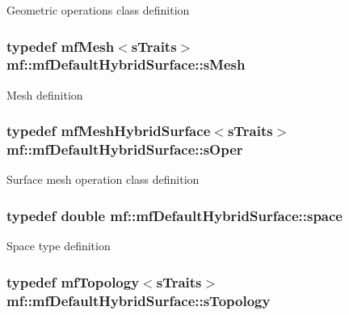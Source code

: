 \label{structmf_1_1mfDefaultHybridSurface_ae5b965dae8d0d44fffca8f6c2819487c}
Geometric operations class definition \hypertarget{structmf_1_1mfDefaultHybridSurface_a3ef0c32e3cccb46dbc126f3d40ade56c}{
\subsubsection[{sMesh}]{\setlength{\rightskip}{0pt plus 5cm}typedef {\bf mfMesh}$<${\bf sTraits}$>$ {\bf mf::mfDefaultHybridSurface::sMesh}}}
\label{structmf_1_1mfDefaultHybridSurface_a3ef0c32e3cccb46dbc126f3d40ade56c}
Mesh definition \hypertarget{structmf_1_1mfDefaultHybridSurface_a048af8fc38cf0f61cb53c72431bdf589}{
\subsubsection[{sOper}]{\setlength{\rightskip}{0pt plus 5cm}typedef {\bf mfMeshHybridSurface}$<${\bf sTraits}$>$ {\bf mf::mfDefaultHybridSurface::sOper}}}
\label{structmf_1_1mfDefaultHybridSurface_a048af8fc38cf0f61cb53c72431bdf589}
Surface mesh operation class definition \hypertarget{structmf_1_1mfDefaultHybridSurface_aa60f8021d9313ec87752ef7c4909d2fa}{
\subsubsection[{space}]{\setlength{\rightskip}{0pt plus 5cm}typedef double {\bf mf::mfDefaultHybridSurface::space}}}
\label{structmf_1_1mfDefaultHybridSurface_aa60f8021d9313ec87752ef7c4909d2fa}
Space type definition \hypertarget{structmf_1_1mfDefaultHybridSurface_a695260a46e88e543eb52c963c21014a6}{
\subsubsection[{sTopology}]{\setlength{\rightskip}{0pt plus 5cm}typedef {\bf mfTopology}$<${\bf sTraits}$>$ {\bf mf::mfDefaultHybridSurface::sTopology}}}
